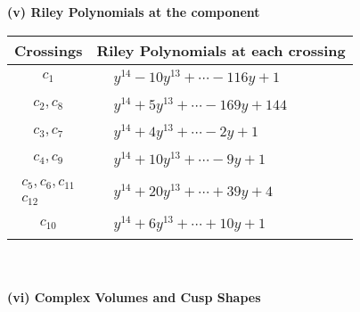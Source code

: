 \documentclass[1p]{elsarticle_modified}
\theoremstyle{definition}
\begin{document}
\newpage\renewcommand{\arraystretch}{1}
\flushleft \textbf{(v) Riley Polynomials at the component}\newline \\
\begin{tabular}{m{50pt}|m{274pt}}
Crossings & \hspace{64pt}Riley Polynomials at each crossing \\
\hline $$\begin{aligned}c_{1}\end{aligned}$$&$\begin{aligned}
&y^{14}-10 y^{13}+\cdots-116 y+1
\end{aligned}$\\
\hline $$\begin{aligned}c_{2},c_{8}\end{aligned}$$&$\begin{aligned}
&y^{14}+5 y^{13}+\cdots-169 y+144
\end{aligned}$\\
\hline $$\begin{aligned}c_{3},c_{7}\end{aligned}$$&$\begin{aligned}
&y^{14}+4 y^{13}+\cdots-2 y+1
\end{aligned}$\\
\hline $$\begin{aligned}c_{4},c_{9}\end{aligned}$$&$\begin{aligned}
&y^{14}+10 y^{13}+\cdots-9 y+1
\end{aligned}$\\
\hline $$\begin{aligned}c_{5},c_{6},c_{11}\\c_{12}\end{aligned}$$&$\begin{aligned}
&y^{14}+20 y^{13}+\cdots+39 y+4
\end{aligned}$\\
\hline $$\begin{aligned}c_{10}\end{aligned}$$&$\begin{aligned}
&y^{14}+6 y^{13}+\cdots+10 y+1
\end{aligned}$\\
\hline
\end{tabular}\\~\\
\newpage\flushleft \textbf{(vi) Complex Volumes and Cusp Shapes}
\end{document}
